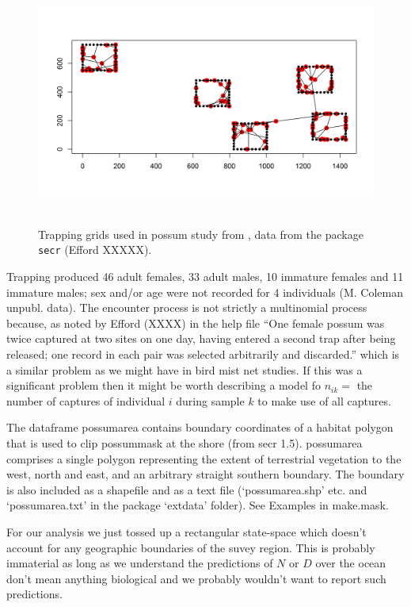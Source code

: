 \begin{figure}
\centering
\includegraphics[width=5in,height=3.2in]{Ch5/figs/possum.png}
\caption{Trapping grids used in possum study from
  \citet{efford_etal:2005}, data from the package \mbox{\tt secr}
  (Efford XXXXX).}
\label{poisson-mn.fig.possum}
\end{figure}

Trapping produced 
46 adult females, 33 adult males, 10 immature females and 11
immature males; sex and/or age were not recorded for 4 individuals
(M. Coleman unpubl. data). 
The encounter process is not strictly a multinomial process because,
as noted by Efford (XXXX) in the help file
 ``One female possum was twice captured at two
sites on one day, having entered a second trap after being released;
one record in each pair was selected arbitrarily and discarded.''
which is a similar problem as we might have in bird mist net studies.
If this was a significant problem then it might be worth describing a
model fo $n_{ik} = $ the number of captures of individual $i$ during
sample $k$ to make use of all captures. 


The dataframe possumarea contains boundary coordinates of a habitat
polygon that is used to clip possummask at the shore (from secr
1.5). possumarea comprises a single polygon representing the extent of
terrestrial vegetation to the west, north and east, and an arbitrary
straight southern boundary. The boundary is also included as a
shapefile and as a text file (‘possumarea.shp’ etc. and
‘possumarea.txt’ in the package ‘extdata’ folder). See Examples in
make.mask.

For our analysis we just tossed up a rectangular state-space which
doesn't account for any geographic boundaries of the suvey region.
This is probably immaterial as long as we understand the predictions of $N$ or
$D$ over the ocean don't mean anything biological and we probably
wouldn't want to report such predictions.

